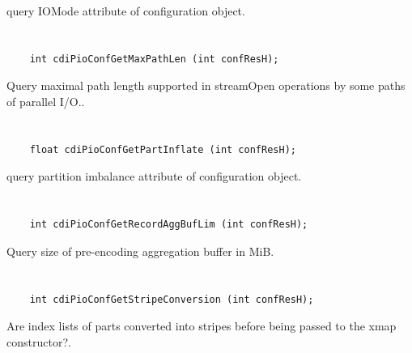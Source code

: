 query IOMode attribute of configuration object.


\section*{\tt {}}

\begin{verbatim}
    int cdiPioConfGetMaxPathLen (int confResH);
\end{verbatim}

Query maximal path length supported in
streamOpen operations by some paths of parallel I/O..


\section*{\tt {}}

\begin{verbatim}
    float cdiPioConfGetPartInflate (int confResH);
\end{verbatim}

query partition imbalance attribute of
configuration object.


\section*{\tt {}}

\begin{verbatim}
    int cdiPioConfGetRecordAggBufLim (int confResH);
\end{verbatim}

Query size of pre-encoding
aggregation buffer in MiB.


\section*{\tt {}}

\begin{verbatim}
    int cdiPioConfGetStripeConversion (int confResH);
\end{verbatim}

Are index lists of parts converted
into stripes before being passed to the xmap constructor?.


\section*{\tt {}}

